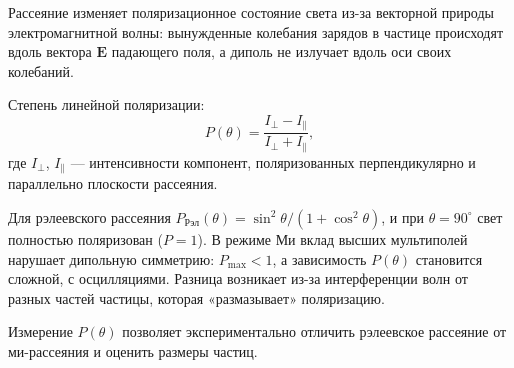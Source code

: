 \documentclass[12pt, a4paper]{article}
\begin{document}
Рассеяние изменяет поляризационное состояние света из-за векторной природы электромагнитной волны: вынужденные колебания зарядов в частице происходят вдоль вектора $\mathbf{E}$ падающего поля, а диполь не излучает вдоль оси своих колебаний.

Степень линейной поляризации:
\begin{equation}
    P(\theta) = \frac{I_\perp - I_\parallel}{I_\perp + I_\parallel},
\end{equation}
где $I_\perp$, $I_\parallel$ — интенсивности компонент, поляризованных перпендикулярно и параллельно плоскости рассеяния.

Для рэлеевского рассеяния $P_{\text{Рэл}}(\theta) = \sin^2\theta / (1 + \cos^2\theta)$, и при $\theta = 90^\circ$ свет полностью поляризован ($P=1$). В режиме Ми вклад высших мультиполей нарушает дипольную симметрию: $P_{\text{max}} < 1$, а зависимость $P(\theta)$ становится сложной, с осцилляциями. Разница возникает из-за интерференции волн от разных частей частицы, которая «размазывает» поляризацию.

Измерение $P(\theta)$ позволяет экспериментально отличить рэлеевское рассеяние от ми-рассеяния и оценить размеры частиц.








\end{document}
